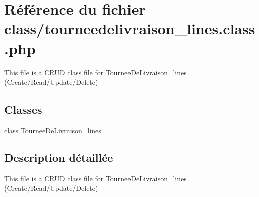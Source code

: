 \hypertarget{tourneedelivraison__lines_8class_8php}{}\section{Référence du fichier class/tourneedelivraison\+\_\+lines.class.\+php}
\label{tourneedelivraison__lines_8class_8php}


This file is a C\+R\+UD class file for \hyperlink{classTourneeDeLivraison__lines}{Tournee\+De\+Livraison\+\_\+lines} (Create/\+Read/\+Update/\+Delete)  


\subsection*{Classes}
\begin{DoxyCompactItemize}
\item 
class \hyperlink{classTourneeDeLivraison__lines}{Tournee\+De\+Livraison\+\_\+lines}
\end{DoxyCompactItemize}


\subsection{Description détaillée}
This file is a C\+R\+UD class file for \hyperlink{classTourneeDeLivraison__lines}{Tournee\+De\+Livraison\+\_\+lines} (Create/\+Read/\+Update/\+Delete) 

